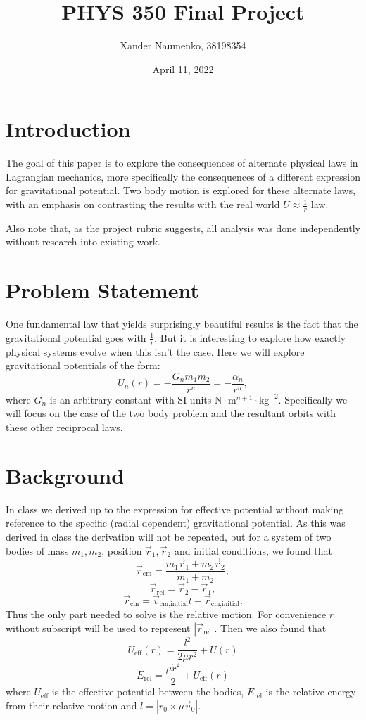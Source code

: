 \documentclass[letterpaper, reqno,11pt]{article}
\begin{document}
\title{PHYS 350 Final Project}
\date{April 11, 2022}
\author{Xander Naumenko, 38198354}
\maketitle

\tableofcontents

\section{Introduction}
 
The goal of this paper is to explore the consequences of alternate physical laws in Lagrangian mechanics, more specifically the consequences of a different expression for gravitational potential. Two body motion is explored for these alternate laws, with an emphasis on contrasting the results with the real world $U\approx\frac{1}{r}$ law. 

Also note that, as the project rubric suggests, all analysis was done independently without research into existing work. 

\section{Problem Statement}

One fundamental law that yields surprisingly beautiful results is the fact that the gravitational potential goes with $\frac{1}{r}$. But it is interesting to explore how exactly physical systems evolve when this isn't the case. Here we will explore gravitational potentials of the form: 
\[
U_n(r)=-\frac{G_nm_1m_2}{r^{n}}=-\frac{\alpha_n}{r^{n}}
,\]
where $G_n$ is an arbitrary constant with SI units $\text{N}\cdot \text{m}^{n+1}\cdot \text{kg}^{-2}$. Specifically we will focus on the case of the two body problem and the resultant orbits with these other reciprocal laws. 

\section{Background}

In class we derived up to the expression for effective potential without making reference to the specific (radial dependent) gravitational potential. As this was derived in class the derivation will not be repeated, but for a system of two bodies of mass $ m_1, m_2$, position $\vec r_1, \vec r_2$ and initial conditions, we found that 
\[
\vec r_{\text{cm}}=\frac{m_1\vec r_1+m_2\vec r_2}{m_1+m_2}
,\]
\[
\vec r_{\text{rel}}=\vec r_2-\vec r_1
,\]
\[
\vec r_{\text{cm}}=\vec v_{\text{cm}, \text{initial}}t+\vec r_{\text{cm}, \text{initial}}
.\]
Thus the only part needed to solve is the relative motion. For convenience $r$ without subscript will be used to represent $|\vec r_{\text{rel}}|$. Then we also found that 
 \[
U_{\text{eff}}(r)=\frac{l^2}{2\mu r^2}+U(r)
\]
\begin{equation}\label{eq:energy}
E_{\text{rel}}=\frac{\mu\dot r^2}{2}+U_{\text{eff}}(r)
\end{equation}
where $U_{\text{eff}}$ is the effective potential between the bodies, $E_{\text{rel}}$ is the relative energy from their relative motion and $l=\left| r_0\times \mu\vec v_0 \right| $. 
\end{document}
